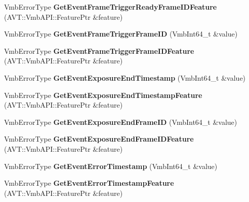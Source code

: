 \begin{DoxyCompactItemize}
\item 
\hypertarget{classMakoCamera_a2e1a2769fe17af6f7c446dc3d6e0aab3}{Vmb\-Error\-Type {\bfseries Get\-Event\-Frame\-Trigger\-Ready\-Frame\-I\-D\-Feature} (A\-V\-T\-::\-Vmb\-A\-P\-I\-::\-Feature\-Ptr \&feature)}\label{classMakoCamera_a2e1a2769fe17af6f7c446dc3d6e0aab3}

\item 
\hypertarget{classMakoCamera_a67150c4a7c5f7e96324e6bfd6dd9ad15}{Vmb\-Error\-Type {\bfseries Get\-Event\-Frame\-Trigger\-Frame\-I\-D} (Vmb\-Int64\-\_\-t \&value)}\label{classMakoCamera_a67150c4a7c5f7e96324e6bfd6dd9ad15}

\item 
\hypertarget{classMakoCamera_a16865d793b7a3e3107358a386c8d3fd3}{Vmb\-Error\-Type {\bfseries Get\-Event\-Frame\-Trigger\-Frame\-I\-D\-Feature} (A\-V\-T\-::\-Vmb\-A\-P\-I\-::\-Feature\-Ptr \&feature)}\label{classMakoCamera_a16865d793b7a3e3107358a386c8d3fd3}

\item 
\hypertarget{classMakoCamera_aa8d51e797339acc005042e593354fe90}{Vmb\-Error\-Type {\bfseries Get\-Event\-Exposure\-End\-Timestamp} (Vmb\-Int64\-\_\-t \&value)}\label{classMakoCamera_aa8d51e797339acc005042e593354fe90}

\item 
\hypertarget{classMakoCamera_ad2eadcd14b9ca61fc092ec81191e1c31}{Vmb\-Error\-Type {\bfseries Get\-Event\-Exposure\-End\-Timestamp\-Feature} (A\-V\-T\-::\-Vmb\-A\-P\-I\-::\-Feature\-Ptr \&feature)}\label{classMakoCamera_ad2eadcd14b9ca61fc092ec81191e1c31}

\item 
\hypertarget{classMakoCamera_aa7f5072546c2db88847bf31e455c1312}{Vmb\-Error\-Type {\bfseries Get\-Event\-Exposure\-End\-Frame\-I\-D} (Vmb\-Int64\-\_\-t \&value)}\label{classMakoCamera_aa7f5072546c2db88847bf31e455c1312}

\item 
\hypertarget{classMakoCamera_a0e106dd12046e69cdad94fa8c624ac28}{Vmb\-Error\-Type {\bfseries Get\-Event\-Exposure\-End\-Frame\-I\-D\-Feature} (A\-V\-T\-::\-Vmb\-A\-P\-I\-::\-Feature\-Ptr \&feature)}\label{classMakoCamera_a0e106dd12046e69cdad94fa8c624ac28}

\item 
\hypertarget{classMakoCamera_adacda98eb6f2e1882f663a86a80d0f94}{Vmb\-Error\-Type {\bfseries Get\-Event\-Error\-Timestamp} (Vmb\-Int64\-\_\-t \&value)}\label{classMakoCamera_adacda98eb6f2e1882f663a86a80d0f94}

\item 
\hypertarget{classMakoCamera_a7d820831e6da071b5e5528e48ff4cde5}{Vmb\-Error\-Type {\bfseries Get\-Event\-Error\-Timestamp\-Feature} (A\-V\-T\-::\-Vmb\-A\-P\-I\-::\-Feature\-Ptr \&feature)}\label{classMakoCamera_a7d820831e6da071b5e5528e48ff4cde5}


\end{DoxyCompactItemize}

